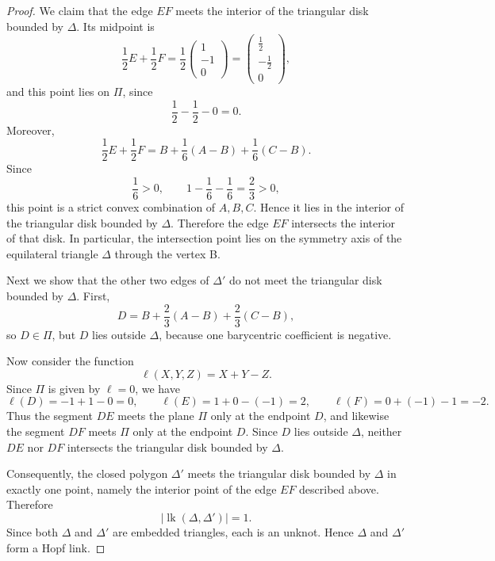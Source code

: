 \documentclass[10pt,a4paper]{amsart}
\begin{document}
\begin{proof}
We claim that the edge \(EF\) meets the interior of the triangular disk bounded by \(\Delta\).
Its midpoint is
\[
\frac12E+\frac12F
=
\frac12
\begin{pmatrix}
1\\ -1\\ 0
\end{pmatrix}
=
\begin{pmatrix}
\frac12\\ -\frac12\\ 0
\end{pmatrix},
\]
and this point lies on \(\Pi\), since
\[
\frac12-\frac12-0=0.
\]
Moreover,
\[
\frac12E+\frac12F
=
B+\frac16(A-B)+\frac16(C-B).
\]
Since
\[
\frac16>0,\qquad
1-\frac16-\frac16=\frac23>0,
\]
this point is a strict convex combination of \(A,B,C\). Hence it lies in the interior of the triangular disk bounded by \(\Delta\). Therefore the edge \(EF\) intersects the interior of that disk.
In particular, the intersection point lies on the symmetry axis of the equilateral triangle 
$\Delta$ through the vertex B.

Next we show that the other two edges of \(\Delta'\) do not meet the triangular disk bounded by \(\Delta\).
First,
\[
D = B + \frac23(A-B) +\frac23(C-B),
\]
so \(D\in \Pi\), but \(D\) lies outside \(\Delta\), because one barycentric coefficient is negative.

Now consider the function
\[
\ell(X,Y,Z)=X+Y-Z.
\]
Since \(\Pi\) is given by \(\ell=0\), we have
\[
\ell(D)= -1+1-0=0,\qquad
\ell(E)=1+0-(-1)=2,\qquad
\ell(F)=0+(-1)-1=-2.
\]
Thus the segment \(DE\) meets the plane \(\Pi\) only at the endpoint \(D\), and likewise the segment \(DF\) meets \(\Pi\) only at the endpoint \(D\). Since \(D\) lies outside \(\Delta\), neither \(DE\) nor \(DF\) intersects the triangular disk bounded by \(\Delta\).

Consequently, the closed polygon \(\Delta'\) meets the triangular disk bounded by \(\Delta\) in exactly one point, namely the interior point of the edge \(EF\) described above. Therefore
\[
\bigl|\operatorname{lk}(\Delta,\Delta')\bigr|=1.
\]
Since both \(\Delta\) and \(\Delta'\) are embedded triangles, each is an unknot. Hence \(\Delta\) and \(\Delta'\) form a Hopf link.
\end{proof}
\end{document}
